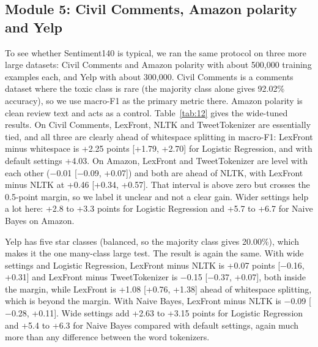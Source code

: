 \documentclass[journal,onecolumn,12pt,a4paper]{IEEEtran}
\begin{document}
\subsection{Module 5: Civil Comments, Amazon polarity and Yelp}\label{sec:4.9}
To see whether Sentiment140 is typical, we ran the same protocol on three more large datasets: Civil Comments and Amazon polarity with about 500,000 training examples each, and Yelp with about 300,000. Civil Comments is a comments dataset where the toxic class is rare (the majority class alone gives 92.02\% accuracy), so we use macro-F1 as the primary metric there. Amazon polarity is clean review text and acts as a control. Table~\ref{tab:12} gives the wide-tuned results. On Civil Comments, LexFront, NLTK and TweetTokenizer are essentially tied, and all three are clearly ahead of whitespace splitting in macro-F1: LexFront minus whitespace is +2.25 points [+1.79, +2.70] for Logistic Regression, and with default settings +4.03. On Amazon, LexFront and TweetTokenizer are level with each other ($-$0.01 [$-$0.09, +0.07]) and both are ahead of NLTK, with LexFront minus NLTK at +0.46 [+0.34, +0.57]. That interval is above zero but crosses the 0.5-point margin, so we label it unclear and not a clear gain. Wider settings help a lot here: +2.8 to +3.3 points for Logistic Regression and +5.7 to +6.7 for Naive Bayes on Amazon.

Yelp has five star classes (balanced, so the majority class gives 20.00\%), which makes it the one many-class large test. The result is again the same. With wide settings and Logistic Regression, LexFront minus NLTK is +0.07 points [$-$0.16, +0.31] and LexFront minus TweetTokenizer is $-$0.15 [$-$0.37, +0.07], both inside the margin, while LexFront is +1.08 [+0.76, +1.38] ahead of whitespace splitting, which is beyond the margin. With Naive Bayes, LexFront minus NLTK is $-$0.09 [$-$0.28, +0.11]. Wide settings add +2.63 to +3.15 points for Logistic Regression and +5.4 to +6.3 for Naive Bayes compared with default settings, again much more than any difference between the word tokenizers.
\end{document}
